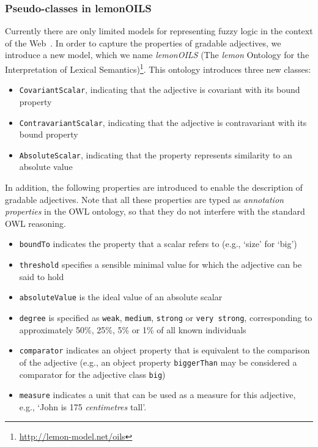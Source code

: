 \documentclass[11pt]{article}
\begin{document}
\subsubsection{Pseudo-classes in lemonOILS}

Currently there are only limited models for representing fuzzy 
logic in the context of the Web~\cite{zhao2008uncertainty}. In order to capture the 
properties of gradable adjectives, we introduce a new model, which we name 
\emph{lemonOILS} (The \emph{lemon} Ontology for the Interpretation of Lexical Semantics)\footnote{\url{http://lemon-model.net/oils}}. This ontology introduces three 
new classes:

\begin{itemize}[noitemsep]
	\item {\tt CovariantScalar}, indicating that the adjective is covariant with its bound property
	\item {\tt ContravariantScalar}, indicating that the adjective is contravariant with its bound property
	\item {\tt AbsoluteScalar}, indicating that the property represents similarity to an absolute value
\end{itemize}

In addition, the following properties are introduced to enable the description 
of gradable adjectives. Note that all these properties are typed as 
\emph{annotation properties} in the OWL ontology, so that they do not interfere 
with the standard OWL reasoning.

\begin{itemize}[noitemsep]
	\item {\tt boundTo} indicates the property that a scalar refers to (e.g., `size' for `big')
	\item {\tt threshold} specifies a sensible minimal value for which the adjective can be said to hold
        \item {\tt absoluteValue} is the ideal value of an absolute scalar
	\item {\tt degree} is specified as {\tt weak}, {\tt medium}, {\tt strong} or {\tt very strong}, corresponding to approximately 50\%, 25\%, 5\% or 1\% of all known individuals
	\item {\tt comparator} indicates an object property that is equivalent to the comparison of the adjective (e.g., an object property {\tt biggerThan} may be considered a comparator for the adjective class {\tt big})
	\item {\tt measure} indicates a unit that can be used as a measure for this adjective, e.g., `John is 175 \textit{centimetres} tall'.
\end{itemize}
\end{document}
